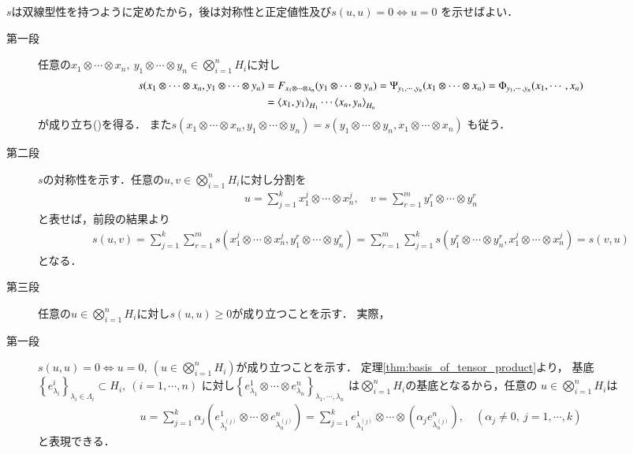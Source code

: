 	\begin{prf} $s$は双線型性を持つように定めたから，後は対称性と正定値性及び$s(u,u)=0 \Leftrightarrow u=0$
		を示せばよい．
		\begin{description}
			\item[第一段]
				任意の$x_1 \otimes \cdots \otimes x_n,\ y_1 \otimes \cdots \otimes y_n 
				\in \bigotimes_{i=1}^n H_i$に対し
				\begin{align}
					s(x_1 \otimes \cdots \otimes x_n,y_1 \otimes \cdots \otimes y_n)
					&= F_{x_1 \otimes \cdots \otimes x_n}(y_1 \otimes \cdots \otimes y_n)
					= \Psi_{y_1,\cdots,y_n}(x_1 \otimes \cdots \otimes x_n)
					= \Phi_{y_1,\cdots,y_n}(x_1, \cdots, x_n) \\
					&= \inprod<x_1,y_1>_{H_1} \cdots \inprod<x_n,y_n>_{H_n}
				\end{align}
				が成り立ち()を得る．
				また$s(x_1 \otimes \cdots \otimes x_n,y_1 \otimes \cdots \otimes y_n)
				= s(y_1 \otimes \cdots \otimes y_n,x_1 \otimes \cdots \otimes x_n)$
				も従う．
				
			\item[第二段]
				$s$の対称性を示す．任意の$u,v \in \bigotimes_{i=1}^n H_i$に対し分割を
				\begin{align}
					u = \sum_{j=1}^k x^j_1 \otimes \cdots \otimes x^j_n,
					\quad v = \sum_{r=1}^m y^r_1 \otimes \cdots \otimes y^r_n
				\end{align}
				と表せば，前段の結果より
				\begin{align}
					s(u,v) = \sum_{j=1}^k \sum_{r=1}^m s(x^j_1 \otimes \cdots \otimes x^j_n,y^r_1 \otimes \cdots \otimes y^r_n)
					= \sum_{r=1}^m \sum_{j=1}^k s(y^r_1 \otimes \cdots \otimes y^r_n,x^j_1 \otimes \cdots \otimes x^j_n)
					= s(v,u)
				\end{align}
				となる．
				
			\item[第三段]
				任意の$u \in \bigotimes_{i=1}^n H_i$に対し$s(u,u) \geq 0$が成り立つことを示す．
				実際，
				
			\item[第一段]
				$s(u,u)=0 \Leftrightarrow u=0,\ (u \in \bigotimes_{i=1}^n H_i)$が成り立つことを示す．
				定理\ref{thm:basis_of_tensor_product}より，
				基底$\left\{ e^i_{\lambda_i} \right\}_{\lambda_i \in \Lambda_i} \subset H_i,\ (i=1,\cdots,n)$
				に対し$\left\{ e^1_{\lambda_1} \otimes \cdots \otimes e^n_{\lambda_n} \right\}_{\lambda_1,\cdots,\lambda_n}$
				は$\bigotimes_{i=1}^n H_i$の基底となるから，任意の
				$u \in \bigotimes_{i=1}^n H_i$は
				\begin{align}
					u = \sum_{j=1}^k \alpha_j \left( e^1_{\lambda^{(j)}_1} \otimes \cdots \otimes e^n_{\lambda^{(j)}_n} \right)
					= \sum_{j=1}^k e^1_{\lambda^{(j)}_1} \otimes \cdots \otimes \left( \alpha_j e^n_{\lambda^{(j)}_n} \right),
					\quad (\alpha_j \neq 0,\ j=1,\cdots,k)
				\end{align}
				と表現できる．
		\end{description}
	\end{prf}
	
